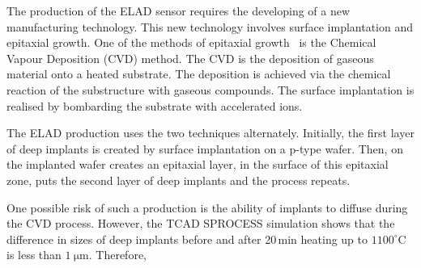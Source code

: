 
The production of the ELAD sensor requires the developing of a new manufacturing technology. 
This new technology involves surface implantation and epitaxial growth. 
One of the methods of epitaxial growth~\cite{Lutz} is the Chemical Vapour Deposition (CVD) method. 
The CVD is the deposition of gaseous material onto a heated substrate. 
The deposition is achieved via the chemical reaction of the substructure with gaseous compounds. 
The surface implantation is realised by bombarding the substrate with accelerated ions.

The ELAD production uses the two techniques alternately. 
Initially, the first layer of deep implants is created by surface implantation on a p-type wafer. 
Then, on the implanted wafer creates an epitaxial layer, in the surface of this epitaxial zone, puts the second layer of deep implants and the process repeats. %

One possible risk of such a production is the ability of implants to diffuse during the CVD process. 
However, the TCAD SPROCESS simulation shows that the difference in sizes of deep implants before and after 20\,min heating up to $1100^\circ$C is less than $\SI{1}{\um}$. 
Therefore, %
